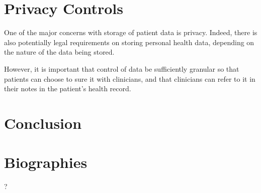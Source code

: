 \documentclass{chi-ext}
\begin{document}
%
%
%
%
% 


\section{Privacy Controls}

One of the major concerns with storage of patient data is privacy. Indeed, there is also potentially
legal requirements on storing personal health data, depending on the nature of the data being
stored.

However, it is important that control of data be sufficiently granular so that patients can choose
to sure it with clinicians, and that clinicians can refer to it in their notes in the patient's health
record.


\section{Conclusion}



\section{Biographies}
?
\end{document}
